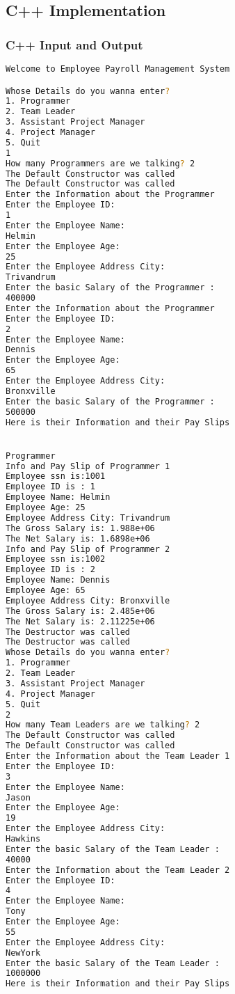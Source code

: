 \documentclass[11pt]{article}
\begin{document}
\subsection{C++ Implementation}




\subsubsection{C++ Input and Output}
\begin{lstlisting}[language=bash, caption=C++ Output]
Welcome to Employee Payroll Management System

Whose Details do you wanna enter?
1. Programmer
2. Team Leader
3. Assistant Project Manager
4. Project Manager
5. Quit
1
How many Programmers are we talking? 2
The Default Constructor was called
The Default Constructor was called
Enter the Information about the Programmer
Enter the Employee ID:
1
Enter the Employee Name:
Helmin
Enter the Employee Age:
25
Enter the Employee Address City:
Trivandrum
Enter the basic Salary of the Programmer :
400000
Enter the Information about the Programmer
Enter the Employee ID:
2
Enter the Employee Name:
Dennis
Enter the Employee Age:
65
Enter the Employee Address City:
Bronxville
Enter the basic Salary of the Programmer :
500000
Here is their Information and their Pay Slips


Programmer
Info and Pay Slip of Programmer 1
Employee ssn is:1001
Employee ID is : 1
Employee Name: Helmin
Employee Age: 25
Employee Address City: Trivandrum
The Gross Salary is: 1.988e+06
The Net Salary is: 1.6898e+06
Info and Pay Slip of Programmer 2
Employee ssn is:1002
Employee ID is : 2
Employee Name: Dennis
Employee Age: 65
Employee Address City: Bronxville
The Gross Salary is: 2.485e+06
The Net Salary is: 2.11225e+06
The Destructor was called
The Destructor was called
Whose Details do you wanna enter?
1. Programmer
2. Team Leader
3. Assistant Project Manager
4. Project Manager
5. Quit
2
How many Team Leaders are we talking? 2
The Default Constructor was called
The Default Constructor was called
Enter the Information about the Team Leader 1
Enter the Employee ID:
3
Enter the Employee Name:
Jason
Enter the Employee Age:
19
Enter the Employee Address City:
Hawkins
Enter the basic Salary of the Team Leader :
40000
Enter the Information about the Team Leader 2
Enter the Employee ID:
4
Enter the Employee Name:
Tony
Enter the Employee Age:
55
Enter the Employee Address City:
NewYork
Enter the basic Salary of the Team Leader :
1000000
Here is their Information and their Pay Slips



\end{lstlisting}
\end{document}
